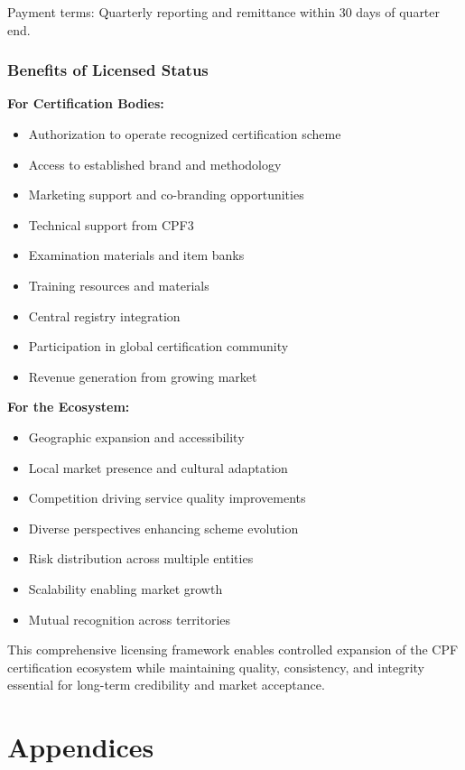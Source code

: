 \documentclass[11pt,a4paper]{article}
\begin{document}
Payment terms: Quarterly reporting and remittance within 30 days of quarter end.

\subsubsection{Benefits of Licensed Status}

\textbf{For Certification Bodies:}

\begin{itemize}
\item Authorization to operate recognized certification scheme
\item Access to established brand and methodology
\item Marketing support and co-branding opportunities
\item Technical support from CPF3
\item Examination materials and item banks
\item Training resources and materials
\item Central registry integration
\item Participation in global certification community
\item Revenue generation from growing market
\end{itemize}

\textbf{For the Ecosystem:}

\begin{itemize}
\item Geographic expansion and accessibility
\item Local market presence and cultural adaptation
\item Competition driving service quality improvements
\item Diverse perspectives enhancing scheme evolution
\item Risk distribution across multiple entities
\item Scalability enabling market growth
\item Mutual recognition across territories
\end{itemize}

This comprehensive licensing framework enables controlled expansion of the CPF certification ecosystem while maintaining quality, consistency, and integrity essential for long-term credibility and market acceptance.


\section*{Appendices}
\end{document}
